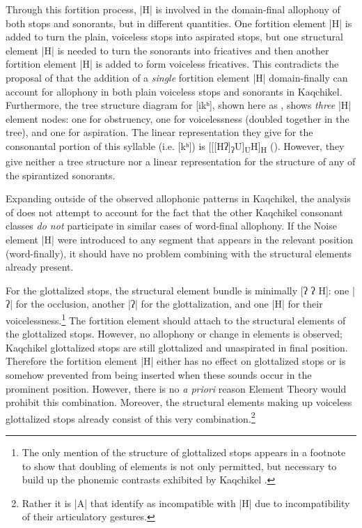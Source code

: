 \documentclass[output=paper,colorlinks,citecolor=brown]{langscibook}
\begin{document}
Through this fortition process, |H| is involved in the domain-final allophony of both stops and sonorants, but in different quantities. One fortition element |H| is added to turn the plain, voiceless stops into aspirated stops, but one structural element |H| is needed to turn the sonorants into fricatives and then another fortition element |H| is added to form voiceless fricatives. This contradicts the proposal of \citet{nasukawa_backley_2018} that the addition of a \emph{single} fortition element |H| domain-finally can account for allophony in both plain voiceless stops and sonorants in Kaqchikel. Furthermore, the tree structure diagram for [ikʰ], shown here as , shows \emph{three} |H| element nodes: one for obstruency, one for voicelessness (doubled together in the tree), and one for aspiration. The linear representation they give for the consonantal portion of this syllable (i.e. [kʰ]) is [[[Hʔ]\textsubscript{ʔ}U]\textsubscript{U}H]\textsubscript{H} (\citeyear[634]{nasukawa_backley_2018}). However, they give neither a tree structure nor a linear representation for the structure of any of the spirantized sonorants.

Expanding outside of the observed allophonic patterns in Kaqchikel, the analysis of \citet{nasukawa_backley_2018} does not attempt to account for the fact that the other Kaqchikel consonant classes \emph{do not} participate in similar cases of word-final allophony. If the Noise element |H| were introduced to any segment that appears in the relevant position (word-finally), it should have no problem combining with the structural elements already present. 

For the glottalized stops, the structural element bundle is minimally [ʔ ʔ H]: one |ʔ| for the occlusion, another |ʔ| for the glottalization, and one |H| for their voicelessness.\footnote{The only mention of the structure of glottalized stops appears in a footnote to show that doubling of elements is not only permitted, but necessary to build up the phonemic contrasts exhibited by Kaqchikel \citep[630]{nasukawa_backley_2018}.} The fortition element should attach to the structural elements of the glottalized stops. However, no allophony or change in elements is observed; Kaqchikel glottalized stops are still glottalized and unaspirated in final position. Therefore the fortition element |H| either has no effect on glottalized stops or is somehow prevented from being inserted when these sounds occur in the prominent position. However, there is no \emph{a priori} reason Element Theory would prohibit this combination. Moreover, the structural elements making up voiceless glottalized stops already consist of this very combination.\footnote{Rather it is |A| that \citet{nasukawa_backley_2018} identify as incompatible with |H| due to incompatibility of their articulatory gestures.}
\end{document}
